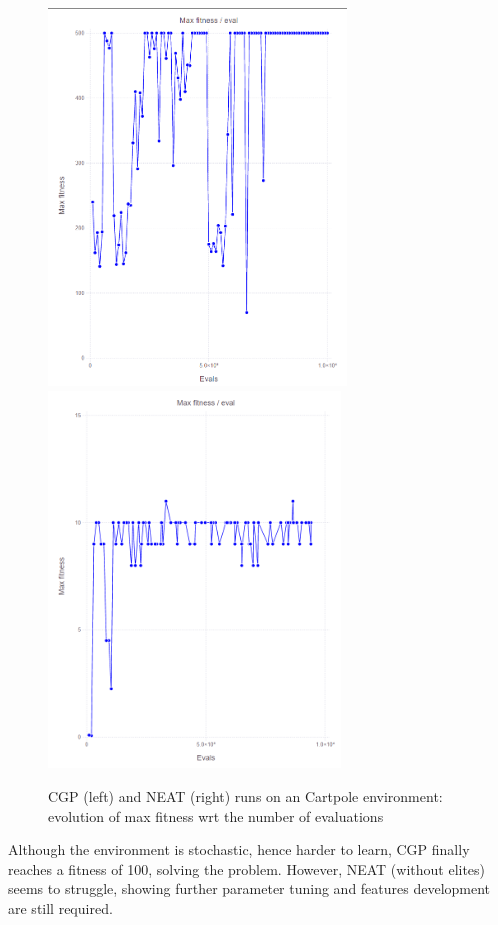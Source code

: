\begin{figure}[H]
\centering
\captionsetup{justification=centering,margin=2cm}
\includegraphics[height=10cm]{images/cgp_cartpole.PNG}
\includegraphics[height=10cm]{images/neat_cartpole.PNG}
\caption{CGP (left) and NEAT (right) runs on an Cartpole environment: evolution of max fitness wrt the number of evaluations}
\end{figure}

Although the environment is stochastic, hence harder to learn, CGP finally reaches a fitness of 100, solving the problem. However, NEAT (without elites) seems to struggle, showing further parameter tuning and features development are  still required. 


